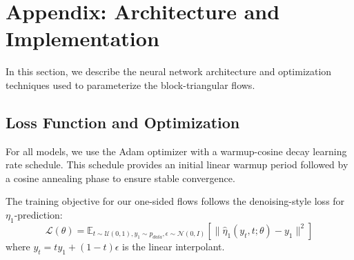 \newpage
\section{Appendix: Architecture and Implementation}
\label{app:implementation}

In this section, we describe the neural network architecture and optimization techniques used to parameterize the block-triangular flows.

\subsection{Loss Function and Optimization}

For all models, we use the Adam optimizer \citep{Kingma2015} with a warmup-cosine decay learning rate schedule. This schedule provides an initial linear warmup period followed by a cosine annealing phase to ensure stable convergence.

The training objective for our one-sided flows follows the denoising-style loss for $\eta_1$-prediction:
\begin{equation}
    \mathcal{L}(\theta) = \mathbb{E}_{t \sim \mathcal{U}(0,1), y_1 \sim p_{data}, \epsilon \sim \mathcal{N}(0,I)} \left[ \| \hat{\eta}_1(y_t, t; \theta) - y_1 \|^2 \right]
\end{equation}
where $y_t = t y_1 + (1-t) \epsilon$ is the linear interpolant.

